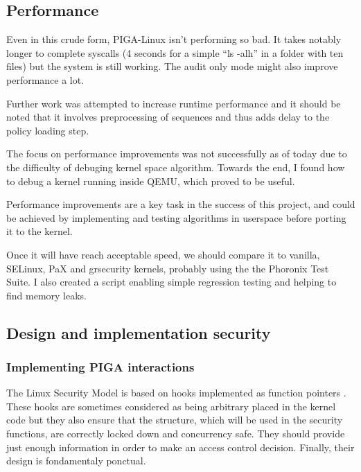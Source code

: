 \documentclass[pdftex,a4paper,titlepage,11pt]{article}
\begin{document}
\subsection{Performance}

Even in this crude form, PIGA-Linux isn't performing so bad. It takes notably
longer to complete syscalls (4 seconds for a simple ``ls -alh'' in a folder with
ten files) but the system is still working. The audit only mode might also
improve performance a lot.

\bigskip

Further work was attempted to increase runtime performance and it should be
noted that it involves preprocessing of sequences and thus adds delay to the
policy loading step.

\bigskip

The focus on performance improvements was not successfully as of today due to
the difficulty of debuging kernel space algorithm. Towards the end, I found
how to debug a kernel running inside QEMU, which proved to be useful.

\bigskip

Performance improvements are a key task in the success of this project, and
could be achieved by implementing and testing algorithms in userspace before
porting it to the kernel.

\bigskip

Once it will have reach acceptable speed, we should compare it to vanilla,
SELinux, PaX and grsecurity kernels, probably using the the Phoronix Test
Suite. I also created a script enabling simple regression testing and helping
to find memory leaks.

%  
% 

\subsection{Design and implementation security}

\subsubsection{Implementing PIGA interactions}

The Linux Security Model is based on hooks implemented as function pointers
\cite{lsm2002linux}. These hooks are sometimes considered as being arbitrary
placed in the kernel code \cite{grsecuritylsm} but they also ensure that the
structure, which will be used in the security functions, are correctly locked
down and concurrency safe. They should provide just enough information in order
to make an access control decision. Finally, their design is fondamentaly
ponctual.
\end{document}
